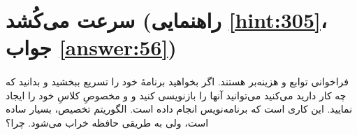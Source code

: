 \section[سرعت می‌کُشد]{سرعت می‌کُشد \protect{} (راهنمایی \ref{hint:305}، جواب \ref{answer:56})}
\paragraph{}\label{prog:94}
فراخوانی توابع  و  هزینه‌بر هستند. اگر بخواهید برنامهٔ خود را تسریع ببخشید و بدانید که چه کار دارید می‌کنید می‌توانید آنها را بازنویسی کنید و  و  مخصوصِ کلاسِ خود را ایجاد نمایید. این کاری است که برنامه‌نویس انجام داده است. الگوریتم تخصیص، بسیار ساده است، ولی به طریقی حافظه خراب می‌شود. چرا؟

